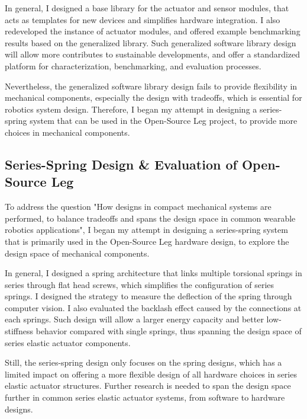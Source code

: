 \documentclass[8pt]{article}
\begin{document}
    In general, I designed a base library for the actuator and sensor modules, that acts as templates for new devices and simplifies hardware integration. I also redeveloped the instance of actuator modules, and offered example benchmarking results based on the generalized library. Such generalized software library design will allow more contributes to sustainable developments, and offer a standardized platform for characterization, benchmarking, and evaluation processes. 

    Nevertheless, the generalized software library design fails to provide flexibility in mechanical components, especially the design with tradeoffs, which is essential for robotics system design. Therefore, I began my attempt in designing a series-spring system that can be used in the Open-Source Leg project, to provide more choices in mechanical components.

    
    \subsection{Series-Spring Design \& Evaluation of Open-Source Leg}  \label{sec:series-spring}

    
    To address the question "How designs in compact mechanical systems are performed, to balance tradeoffs and spans the design space in common wearable robotics applications", I began my attempt in designing a series-spring system that is primarily used in the Open-Source Leg hardware design, to explore the design space of mechanical components.

    In general, I designed a spring architecture that links multiple torsional springs in series through flat head screws, which simplifies the configuration of series springs. I designed the strategy to measure the deflection of the spring through computer vision. I also evaluated the backlash effect caused by the connections at each springs. Such design will allow a larger energy capacity and better low-stiffness behavior compared with single springs, thus spanning the design space of series elastic actuator components. 

    Still, the series-spring design only focuses on the spring designs, which has a limited impact on offering a more flexible design of all hardware choices in series elastic actuator structures. Further research is needed to span the design space further in common series elastic actuator systems, from software to hardware designs.
    
\end{document}
